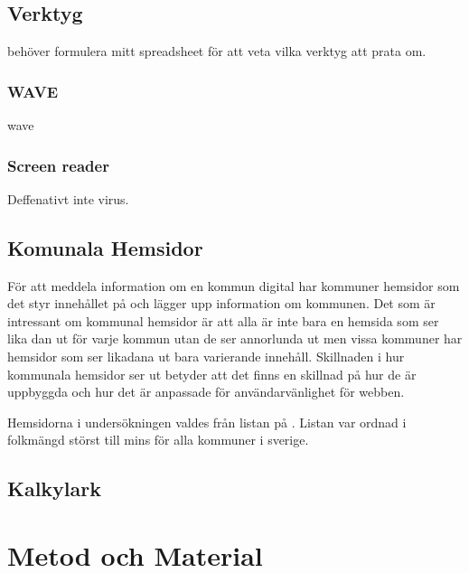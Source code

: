 \documentclass[11p]{article}
\begin{document}
    \subsection{Verktyg}
    behöver formulera mitt spreadsheet för att veta vilka verktyg att prata om.

    \subsubsection{WAVE}
    wave

    \subsubsection{Screen reader}
    Deffenativt inte virus.

    \subsection{Komunala Hemsidor}
    För att meddela information om en kommun digital har kommuner hemsidor som det styr innehållet på och lägger upp information om kommunen.
    Det som är intressant om kommunal hemsidor är att alla är inte bara en hemsida som ser lika dan ut för varje kommun utan de ser annorlunda ut men vissa kommuner har hemsidor som ser likadana ut bara varierande innehåll.
    Skillnaden i hur kommunala hemsidor ser ut betyder att det finns en skillnad på hur de är uppbyggda och hur det är anpassade för användarvänlighet för webben.
    
    Hemsidorna i undersökningen valdes från listan på \textcite{SverigesKommuner}.
    Listan var ordnad i folkmängd störst till mins för alla kommuner i sverige.

    \subsection{Kalkylark}

    
    \section{Metod och Material}
\end{document}

